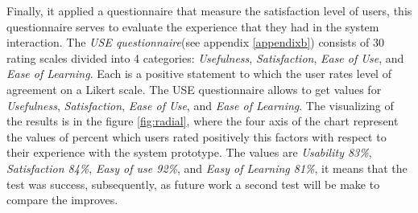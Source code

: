 Finally, it applied a questionnaire that measure the satisfaction
level of users, this questionnaire serves to evaluate the experience
that they had in the system interaction. The \textit{USE
questionnaire}(see appendix \ref{appendixb}) consists of 30 rating
scales divided into 4 categories: \textit{Usefulness},
\textit{Satisfaction}, \textit{Ease of Use}, and \textit{Ease of
Learning}. Each is a positive statement to which the user rates level
of agreement on a Likert scale. The USE questionnaire allows to get
values for \textit{Usefulness}, \textit{Satisfaction}, \textit{Ease of
Use}, and \textit{Ease of Learning}. The visualizing of the results is in
the figure \ref{fig:radial}, where the four axis of the chart
represent the values of percent which users rated positively this
factors with respect to their experience with the system prototype.
The values are \textit{Usability 83\%}, \textit{Satisfaction 84\%},
\textit{Easy of use  92\%}, and \textit{Easy of Learning 81\%}, it
means that the test was success, subsequently, as future work  a
second test will be make to compare the improves.


